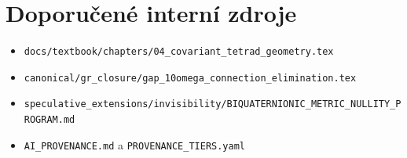 \section*{Doporučené interní zdroje}
\begin{itemize}[leftmargin=*]
  \item \texttt{docs/textbook/chapters/04\_covariant\_tetrad\_geometry.tex}
  \item \texttt{canonical/gr\_closure/gap\_10omega\_connection\_elimination.tex}
  \item \texttt{speculative\_extensions/invisibility/BIQUATERNIONIC\_METRIC\_NULLITY\_PROGRAM.md}
  \item \texttt{AI\_PROVENANCE.md} a \texttt{PROVENANCE\_TIERS.yaml}
\end{itemize}
